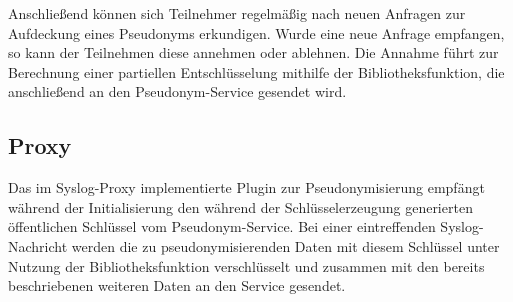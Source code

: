 Anschließend können sich Teilnehmer regelmäßig nach neuen Anfragen zur Aufdeckung eines Pseudonyms erkundigen. Wurde eine neue Anfrage empfangen, so kann der Teilnehmen diese annehmen oder ablehnen. Die Annahme führt zur Berechnung einer partiellen Entschlüsselung mithilfe der Bibliotheksfunktion, die anschließend an den Pseudonym-Service gesendet wird.

\subsection{Proxy}


Das im Syslog-Proxy implementierte Plugin zur Pseudonymisierung empfängt während der Initialisierung den während der Schlüsselerzeugung generierten öffentlichen Schlüssel vom Pseudonym-Service. Bei einer eintreffenden Syslog-Nachricht werden die zu pseudonymisierenden Daten mit diesem Schlüssel unter Nutzung der Bibliotheksfunktion verschlüsselt und zusammen mit den bereits beschriebenen weiteren Daten an den Service gesendet.